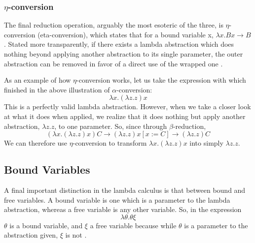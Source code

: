 \documentclass[twocolumn,titlepage,12pt]{article}
\begin{document}
\subsubsection{$\eta$-conversion}
The final reduction operation, arguably the most esoteric of the three, is $\eta$-conversion (eta-conversion), which states that for a bound variable x, $\lambda x.Bx \to B$. Stated more transparently, if there exists a lambda abstraction which does nothing beyond applying another abstraction to its single parameter, the outer abstraction can be removed in favor of a direct use of the wrapped one \cite{etared}.

As an example of how $\eta$-conversion works, let us take the expression with which finished in the above illustration of $\alpha$-conversion:
$$\lambda x.(\lambda z.z)x$$
This is a perfectly valid lambda abstraction. However, when we take a closer look at what it does when applied, we realize that it does nothing but apply another abstraction, $\lambda z.z$, to one parameter. So, since through $\beta$-reduction,
$$(\lambda x.(\lambda z.z)x)C\to (\lambda z.z)x[x:=C]\to (\lambda z.z)C$$
We can therefore use $\eta$-conversion to transform $\lambda x.(\lambda z.z)x$ into simply $\lambda z.z$.

\subsection{Bound Variables}
A final important distinction in the lambda calculus is that between bound and free variables. A bound variable is one which is a parameter to the lambda abstraction, whereas a free variable is any other variable. So, in the expression
$$\lambda \theta.\theta \xi$$
$\theta$ is a bound variable, and $\xi$ a free variable because while $\theta$ is a parameter to the abstraction given, $\xi$ is not \cite{stanfordlc}.
\end{document}
